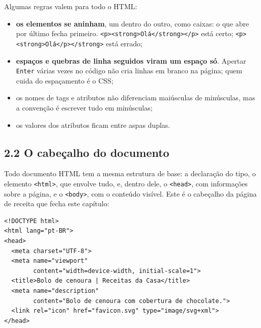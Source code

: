 Algumas regras valem para todo o HTML:

\begin{itemize}
  \item \textbf{os elementos se aninham}, um dentro do outro, como caixas: o que abre por último fecha primeiro. \texttt{<p><strong>Olá</strong></p>} está certo; \texttt{<p><strong>Olá</p></strong>} está errado;
  \item \textbf{espaços e quebras de linha seguidos viram um espaço só}. Apertar \texttt{Enter} várias vezes no código não cria linhas em branco na página; quem cuida do espaçamento é o CSS;
  \item os nomes de tags e atributos não diferenciam maiúsculas de minúsculas, mas a convenção é escrever tudo em minúsculas;
  \item os valores dos atributos ficam entre aspas duplas.
\end{itemize}

\subsection{2.2 O cabeçalho do documento}

Todo documento HTML tem a mesma estrutura de base: a declaração do tipo, o elemento \texttt{<html>}, que envolve tudo, e, dentro dele, o \texttt{<head>}, com informações sobre a página, e o \texttt{<body>}, com o conteúdo visível. Este é o cabeçalho da página de receita que fecha este capítulo:

\begin{codigo}
\begin{Verbatim}[breaklines=true, breaksymbolleft={}, fontsize=\footnotesize]
<!DOCTYPE html>
<html lang="pt-BR">
<head>
  <meta charset="UTF-8">
  <meta name="viewport"
        content="width=device-width, initial-scale=1">
  <title>Bolo de cenoura | Receitas da Casa</title>
  <meta name="description"
        content="Bolo de cenoura com cobertura de chocolate.">
  <link rel="icon" href="favicon.svg" type="image/svg+xml">
</head>
\end{Verbatim}
\end{codigo}

